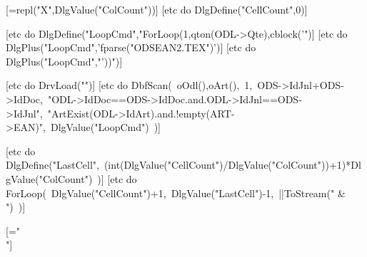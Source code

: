 \documentclass[a4paper]{report}
\begin{document}
\begin{tabularx}{\textwidth}{[=repl("X",DlgValue("ColCount"))]}
[etc do DlgDefine("CellCount",0)]

[etc do DlgDefine("LoopCmd","ForLoop(1,qton(ODL->Qte),cblock('")]
[etc do DlgPlus("LoopCmd",'fparse("ODSEAN2.TEX")')]
[etc do DlgPlus("LoopCmd","'))")]


[etc do DrvLoad("")]
[etc do DbfScan(\
  {oOdl(),oArt()},\
  1,\
  ODS->IdJnl+ODS->IdDoc,\
  "ODL->IdDoc==ODS->IdDoc.and.ODL->IdJnl==ODS->IdJnl",\
  "ArtExist(ODL->IdArt).and.!empty(ART->EAN)",\
  DlgValue("LoopCmd")\
)]

[etc do DlgDefine("LastCell",\
  (int(DlgValue("CellCount")/DlgValue("ColCount"))+1)*DlgValue("ColCount")\
)]
[etc do ForLoop(\
  DlgValue("CellCount")+1,\
  DlgValue("LastCell")-1,\
  {||ToStream(" & ")}\
)]

[="\\"]

\end{tabularx}
\end{document}
